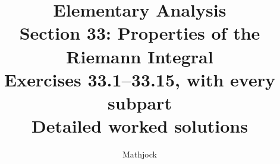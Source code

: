 
\title{\textbf{Elementary Analysis}\\[0.3em]
Section 33: Properties of the Riemann Integral\\[0.4em]
\large Exercises 33.1--33.15, with every subpart\\
Detailed worked solutions}
\author{Mathjock}
\date{}

\maketitle
\bookinfo
\tableofcontents
\clearpage
\setcounter{section}{32}


